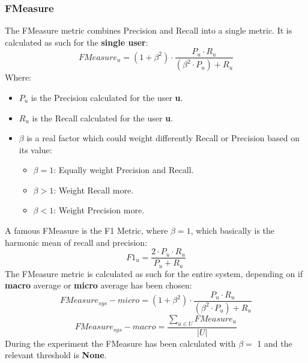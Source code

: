 \documentclass[11pt]{article}
\begin{document}
\subsubsection{FMeasure}\label{subsubsec:f-meas}
The FMeasure metric combines Precision and Recall into a single metric.
It is calculated as such for the \textbf{single user}:
\hfill\break
\hfill\break
    \[
        FMeasure_u = (1 + \beta^2) \cdot \frac{P_u \cdot R_u}{(\beta^2 \cdot P_u) + R_u}
    \]
\hfill\break
\hfill\break
    Where:
\begin{itemize}
    \item $P_u$ is the Precision calculated for the user \textbf{u}.
    \item $R_u$ is the Recall calculated for the user \textbf{u}.
    \item $\beta$ is a real factor which could weight differently Recall or Precision based on its value:
    \begin{itemize}
        \item $\beta = 1$: Equally weight Precision and Recall.
        \item $\beta > 1$: Weight Recall more.
        \item $\beta < 1$: Weight Precision more.
    \end{itemize}
\end{itemize}
\hfill\break
\hfill\break
A famous FMeasure is the F1 Metric, where $\beta = 1$, which basically is the harmonic mean of recall and
precision:
\hfill\break
\hfill\break
    \[
         F1_u = \frac{2 \cdot P_u \cdot R_u}{P_u + R_u}
    \]
\hfill\break
\hfill\break
The FMeasure metric is calculated as such for the entire system, depending on if \textbf{macro} average or
\textbf{micro} average has been chosen:
\hfill\break
\hfill\break
    \[
        FMeasure_{sys} - micro = (1 + \beta^2) \cdot \frac{P_u \cdot R_u}{(\beta^2 \cdot P_u) + R_u}
    \]
\hfill\break
\hfill\break
    \[
        FMeasure_{sys} - macro = \frac{\sum_{u \in U} FMeasure_u}{|U|}
    \]
\hfill\break
\hfill\break
During the experiment the FMeasure has been calculated with $\beta = $
1 and the relevant threshold is
\textbf{None}.
\hfill\break
\hfill\break

\end{document}
